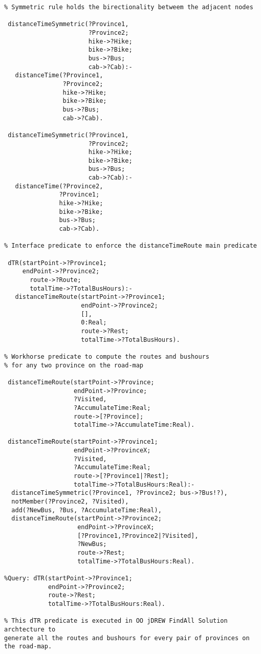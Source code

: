 \footnotesize
\begin{verbatim}	
% Symmetric rule holds the birectionality betweem the adjacent nodes

 distanceTimeSymmetric(?Province1,
                       ?Province2; 
                       hike->?Hike; 
                       bike->?Bike; 
                       bus->?Bus; 
                       cab->?Cab):-
   distanceTime(?Province1,
                ?Province2; 
                hike->?Hike; 
                bike->?Bike; 
                bus->?Bus; 
                cab->?Cab).

 distanceTimeSymmetric(?Province1,
                       ?Province2; 
                       hike->?Hike; 
                       bike->?Bike; 
                       bus->?Bus; 
                       cab->?Cab):-
   distanceTime(?Province2,
               ?Province1; 
               hike->?Hike; 
               bike->?Bike; 
               bus->?Bus; 
               cab->?Cab).
  
% Interface predicate to enforce the distanceTimeRoute main predicate
 
 dTR(startPoint->?Province1; 
     endPoint->?Province2; 
	   route->?Route; 
	   totalTime->?TotalBusHours):-
   distanceTimeRoute(startPoint->?Province1; 
                     endPoint->?Province2; 
                     [], 
                     0:Real; 
                     route->?Rest; 
                     totalTime->?TotalBusHours).
 
% Workhorse predicate to compute the routes and bushours 
% for any two province on the road-map
  
 distanceTimeRoute(startPoint->?Province; 
                   endPoint->?Province; 
                   ?Visited, 
                   ?AccumulateTime:Real; 
                   route->[?Province];  
                   totalTime->?AccumulateTime:Real).

 distanceTimeRoute(startPoint->?Province1; 
                   endPoint->?ProvinceX; 
                   ?Visited, 
                   ?AccumulateTime:Real; 
                   route->[?Province1|?Rest];  
                   totalTime->?TotalBusHours:Real):-  
  distanceTimeSymmetric(?Province1, ?Province2; bus->?Bus!?),
  notMember(?Province2, ?Visited),
  add(?NewBus, ?Bus, ?AccumulateTime:Real),
  distanceTimeRoute(startPoint->?Province2; 
                    endPoint->?ProvinceX; 
                    [?Province1,?Province2|?Visited], 
                    ?NewBus; 
                    route->?Rest; 
                    totalTime->?TotalBusHours:Real).
  
%Query: dTR(startPoint->?Province1; 
            endPoint->?Province2; 
            route->?Rest; 
            totalTime->?TotalBusHours:Real).

% This dTR predicate is executed in OO jDREW FindAll Solution archtecture to 
generate all the routes and bushours for every pair of provinces on the road-map. 
\end{verbatim}

